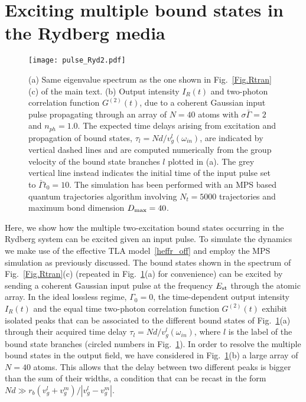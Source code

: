 \documentclass[pra,twocolumn,showpacs,preprintnumbers,amsmath,amssymb]{revtex4-1}
\begin{document}
\section{Exciting multiple bound states in the Rydberg media}\label{App.manybodyBSRyd}
\begin{figure}
\texttt{[image: pulse\_Ryd2.pdf]}%
\caption{(a) Same eigenvalue spectrum as the one shown in Fig.~\ref{Fig.Rtran}(c) of the main text. (b) Output intensity  $I_R(t)$ and two-photon correlation function $G^{(2)}(t)$, due to a coherent Gaussian input pulse propagating through an array of $N=40$ atoms with $\sigma\bar\Gamma=2$ and $n_{ph}=1.0$. The expected time delays arising from excitation and propagation of bound states, $\tau_l=Nd/v^l_g(\omega_{in})$, are indicated by vertical dashed lines and are computed numerically from the group velocity of the bound state branches $l$ plotted in (a). The grey vertical line instead indicates the initial time of the input pulse set to  $\bar\Gamma t_0=10$. The simulation has been performed with an MPS based quantum trajectories algorithm involving $N_t=5000$ trajectories and maximum bond dimension $D_{\rm max}=40$.  }
\label{Fig.pulse_stark}
\end{figure}

Here, we show how the multiple two-excitation bound states occurring in the Rydberg system can be excited given an input pulse. To simulate the dynamics we make use of the effective TLA model~\eqref{heffr_off} and employ the MPS simulation as previously discussed.
The bound states shown in the spectrum of Fig.~\ref{Fig.Rtran}(c) (repeated in 
Fig.~\ref{Fig.pulse_stark}(a) for convenience) can be excited by sending a coherent Gaussian input pulse at the frequency $E_{\rm st}$ through the atomic array. In the ideal lossless regime, $\Gamma_0=0$, the time-dependent output intensity $I_R(t)$ and the equal time two-photon correlation function $G^{(2)}(t)$ exhibit isolated peaks that can be associated to the different bound states of Fig.~\ref{Fig.pulse_stark}(a) through their acquired time delay $\tau_l=Nd/v^l_g(\omega_{in})$, where $l$ is the label of the bound state branches (circled numbers in Fig.~\ref{Fig.pulse_stark}). In order to resolve the multiple bound states in the output field, we have considered in Fig.~\ref{Fig.pulse_stark}(b) a large array of $N=40$ atoms. This allows that the delay between two different peaks is bigger than the sum of their widths, a condition that can be recast in the form $Nd\gg r_b(v_g^l+v_g^m)/|v_g^l-v_g^m|$. 
 
\end{document}
